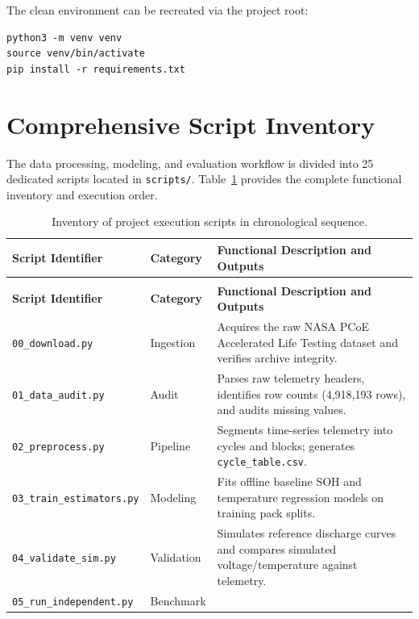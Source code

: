 The clean environment can be recreated via the project root:
\begin{verbatim}
python3 -m venv venv
source venv/bin/activate
pip install -r requirements.txt
\end{verbatim}

\section{Comprehensive Script Inventory}

The data processing, modeling, and evaluation workflow is divided into
25 dedicated scripts located in \texttt{scripts/}. Table~\ref{tab:script_inventory}
provides the complete functional inventory and execution order.

\begin{center}
\small
\begin{longtable}{>{\raggedright\footnotesize}p{4.4cm} >{\centering\arraybackslash}p{2.0cm} >{\raggedright\arraybackslash}p{7.4cm}}
  \caption{Inventory of project execution scripts in chronological sequence.}
  \label{tab:script_inventory} \\
  \toprule
  \textbf{Script Identifier} & \textbf{Category} & \textbf{Functional Description and Outputs} \\
  \midrule
  \endfirsthead
  \multicolumn{3}{c}{\tablename\ \thetable\ -- \textit{Continued}}\\
  \toprule
  \textbf{Script Identifier} & \textbf{Category} & \textbf{Functional Description and Outputs} \\
  \midrule
  \endhead
  \bottomrule
  \endfoot
  \texttt{00\_download.py} & Ingestion &
  Acquires the raw NASA PCoE Accelerated Life Testing dataset and verifies archive integrity. \\
  \texttt{01\_data\_audit.py} & Audit &
  Parses raw telemetry headers, identifies row counts (4{,}918{,}193 rows), and audits missing values. \\
  \texttt{02\_preprocess.py} & Pipeline &
  Segments time-series telemetry into cycles and blocks; generates \texttt{cycle\_table.csv}. \\
  \texttt{03\_train\_estimators.py} & Modeling &
  Fits offline baseline SOH and temperature regression models on training pack splits. \\
  \texttt{04\_validate\_sim.py} & Validation &
  Simulates reference discharge curves and compares simulated voltage/temperature against telemetry. \\
  \texttt{05\_run\_independent.py} & Benchmark &

\end{longtable}
\end{center}
